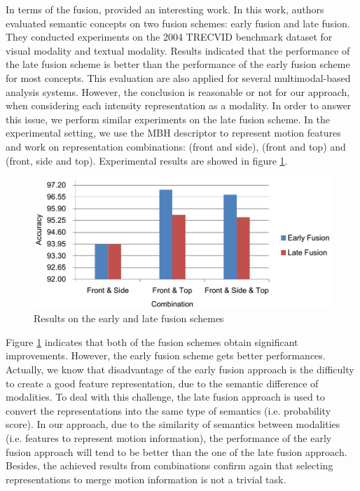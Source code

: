 \documentclass[review]{elsarticle}
\begin{document}
In terms of the fusion, \cite{snoek2005early} provided an interesting work. In this work, authors evaluated semantic concepts on two fusion schemes: early fusion and late fusion. They conducted experiments on the 2004 TRECVID benchmark dataset for visual modality and textual modality. Results indicated that the performance of the late fusion scheme is better than the performance of the early fusion scheme for most concepts. This evaluation are also applied for several multimodal-based analysis systems. However, the conclusion is reasonable or not for our approach, when considering each intensity representation as a modality. In order to answer this issue, we perform similar experiments on the late fusion scheme. In the experimental setting, we use the MBH descriptor to represent motion features and work on representation combinations: (front and side), (front and top) and (front, side and top). Experimental results are showed in figure \ref{lbl:Figure_EarlyLateFusion}.

\begin{figure}[H]
    \centering
    \includegraphics[width=\textwidth]{Chart_EarlyLateFusion.eps}
	\caption{\label{lbl:Figure_EarlyLateFusion}Results on the early and late fusion schemes}
\end{figure}

Figure \ref{lbl:Figure_EarlyLateFusion} indicates that both of the fusion schemes obtain significant improvements. However, the early fusion scheme gets better performances. Actually, we know that disadvantage of the early fusion approach is the difficulty to create a good feature representation, due to the semantic difference of modalities. To deal with this challenge, the late fusion approach is used to convert the representations into the same type of semantics (i.e. probability score). In our approach, due to the similarity of semantics between modalities (i.e. features to represent motion information), the performance of the early fusion approach will tend to be better than the one of the late fusion approach. Besides, the achieved results from combinations confirm again that selecting representations to merge motion information is not a trivial task.
\end{document}
